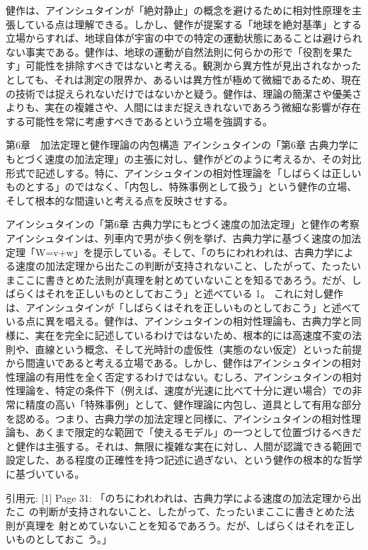 \documentclass{article}
\begin{document}
健作は、アインシュタインが「絶対静止」の概念を避けるために相対性原理を主張している点は理解できる。しかし、健作が提案する「地球を絶対基準」とする立場からすれば、地球自体が宇宙の中での特定の運動状態にあることは避けられない事実である。健作は、地球の運動が自然法則に何らかの形で「役割を果たす」可能性を排除すべきではないと考える。観測から異方性が見出されなかったとしても、それは測定の限界か、あるいは異方性が極めて微細であるため、現在の技術では捉えられないだけではないかと疑う。健作は、理論の簡潔さや優美さよりも、実在の複雑さや、人間にはまだ捉えきれないであろう微細な影響が存在する可能性を常に考慮すべきであるという立場を強調する。




第6章　加法定理と健作理論の内包構造
アインシュタインの「第6章 古典力学にもとづく速度の加法定理」の主張に対し、健作がどのように考えるか、その対比形式で記述しする。特に、アインシュタインの相対性理論を「しばらくは正しいものとする」のではなく、「内包し、特殊事例として扱う」という健作の立場、そして根本的な間違いと考える点を反映させする。

アインシュタインの「第6章 古典力学にもとづく速度の加法定理」と健作の考察
アインシュタインは、列車内で男が歩く例を挙げ、古典力学に基づく速度の加法定理「W=v+w」を提示している。そして、「のちにわれわれは、古典力学による速度の加法定理から出たこの判断が支持されないこと、したがって、たったいまここに書きとめた法則が真理を射とめていないことを知るであろう。だが、しばらくはそれを正しいものとしておこう」と述べている 1。
これに対し健作は、アインシュタインが「しばらくはそれを正しいものとしておこう」と述べている点に異を唱える。健作は、アインシュタインの相対性理論も、古典力学と同様に、実在を完全に記述しているわけではないため、根本的には高速度不変の法則や、直線という概念、そして光時計の虚仮性（実態のない仮定）といった前提から間違いであると考える立場である。しかし、健作はアインシュタインの相対性理論の有用性を全く否定するわけではない。むしろ、アインシュタインの相対性理論を、特定の条件下（例えば、速度が光速に比べて十分に遅い場合）での非常に精度の高い「特殊事例」として、健作理論に内包し、道具として有用な部分を認める。つまり、古典力学の加法定理と同様に、アインシュタインの相対性理論も、あくまで限定的な範囲で「使えるモデル」の一つとして位置づけるべきだと健作は主張する。それは、無限に複雑な実在に対し、人間が認識できる範囲で設定した、ある程度の正確性を持つ記述に過ぎない、という健作の根本的な哲学に基づいている。

引用元:
[1] Page 31: 「のちにわれわれは、古典力学による速度の加法定理から出たこ の判断が支持されないこと、したがって、たったいまここに書きとめた法則が真理を 射とめていないことを知るであろう。だが、しばらくはそれを正しいものとしておこ う。」
\end{document}

